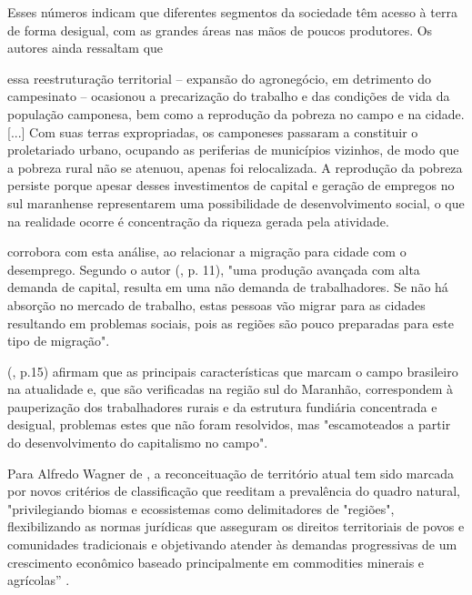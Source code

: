 Esses números indicam que diferentes segmentos da sociedade têm acesso à terra de forma desigual, com as grandes áreas nas mãos de poucos produtores. Os autores ainda ressaltam que

\begin{citacao}
essa reestruturação territorial – expansão do agronegócio, em detrimento do campesinato – ocasionou a precarização do trabalho e das condições de vida da população camponesa, bem como a reprodução da pobreza no campo e na cidade. [...] Com suas terras expropriadas, os camponeses passaram a constituir o proletariado urbano, ocupando as periferias de municípios vizinhos, de modo que a pobreza rural não se atenuou, apenas foi relocalizada. A reprodução da pobreza persiste porque apesar desses investimentos de capital e geração de empregos no sul maranhense representarem uma possibilidade de desenvolvimento social, o que na realidade ocorre é concentração da riqueza gerada pela atividade.
\cite[p. 12-16]{lima_locatel_silva}
\end{citacao}

 corrobora com esta análise, ao relacionar a migração para cidade com o desemprego. Segundo o autor (\citeyear{studte2008}, p. 11), "uma produção avançada com alta demanda de capital, resulta em uma não demanda de trabalhadores. Se não há absorção no mercado de trabalho, estas pessoas vão migrar para as cidades resultando em problemas sociais, pois as regiões são pouco preparadas para este tipo de migração".

 (\citeyear{lima_locatel_silva}, p.15) afirmam que as principais características que marcam o campo brasileiro na atualidade e, que são verificadas na região sul do Maranhão, correspondem à pauperização dos trabalhadores rurais e da estrutura fundiária concentrada e desigual, problemas estes que não foram resolvidos, mas "escamoteados a partir do desenvolvimento do capitalismo no campo".

Para Alfredo Wagner de , a reconceituação de território atual tem sido marcada por novos critérios de classificação que reeditam a prevalência do quadro natural, "privilegiando biomas e ecossistemas como delimitadores de "regiões", flexibilizando as normas jurídicas que asseguram os direitos territoriais de povos e comunidades tradicionais e objetivando atender às demandas progressivas de um crescimento econômico baseado principalmente em commodities minerais e agrícolas” \cite{almeida}.

